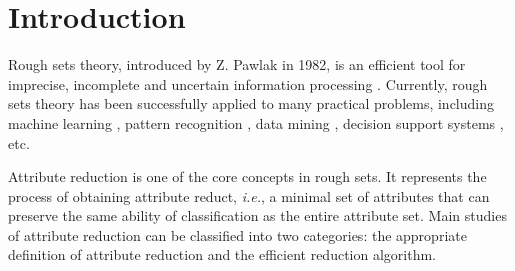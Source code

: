 \documentclass[review]{elsarticle}
\begin{document}
\linenumbers

\section{Introduction}
	\par Rough sets theory, introduced by Z. Pawlak \cite{Pawlak1982} in 1982, is an efficient tool for imprecise, incomplete and uncertain information processing \cite{Huang2016,Shi2016,zhan2017}. Currently, rough sets theory has been successfully applied to many practical problems, including machine learning \cite{das2016ierspop,xie2018test}, pattern recognition \cite{hu2015flow,huang2012enhanced}, data mining \cite{wang2013attribute}, decision support systems \cite{kaya2013hybrid}, etc.
	
	\par Attribute reduction is one of the core concepts in rough sets\cite{thangavel2009}. It represents the process of obtaining attribute reduct, \emph{i.e.}, a minimal set of attributes that can preserve the same ability of classification as the entire attribute set. Main studies of attribute reduction can be classified into two categories: the appropriate definition of attribute reduction and the efficient reduction algorithm.
	
\end{document}
